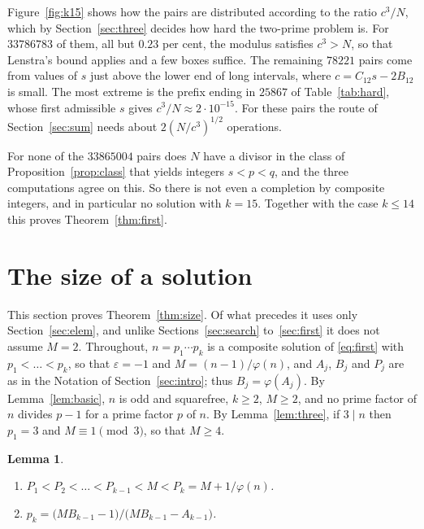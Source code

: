 \documentclass[11pt,reqno]{amsart}
\numberwithin{equation}{section}
\theoremstyle{plain}
\newtheorem{lemma}[theorem]{Lemma}
\theoremstyle{definition}
\theoremstyle{remark}
\begin{document}
Figure~\ref{fig:k15} shows how the pairs are distributed according to
the ratio $c^3/N$, which by Section~\ref{sec:three} decides how hard
the two-prime problem is. For $33786783$ of them, all but $0.23$ per
cent, the modulus satisfies $c^3>N$, so that Lenstra's bound applies
and a few boxes suffice. The remaining $78221$ pairs come from values
of $s$ just above the lower end of long intervals, where
$c=C_{12}s-2B_{12}$ is small. The most extreme is the prefix ending in
$25867$ of Table~\ref{tab:hard}, whose first admissible $s$ gives
$c^3/N\approx2\cdot10^{-15}$. For these pairs the route of
Section~\ref{sec:sum} needs about $2(N/c^3)^{1/2}$ operations.

For none of the $33865004$ pairs does $N$ have a divisor in the class of
Proposition~\ref{prop:class} that yields integers $s<p<q$, and the
three computations agree on this. So there is
not even a completion by composite integers, and in particular no
solution with $k=15$. Together with the case $k\le14$ this proves
Theorem~\ref{thm:first}.

\section{The size of a solution}\label{sec:size}

This section proves Theorem~\ref{thm:size}. Of what precedes it uses
only Section~\ref{sec:elem}, and unlike Sections~\ref{sec:search}
to~\ref{sec:first} it does not assume $M=2$. Throughout,
$n=p_1\cdots p_k$ is a composite solution of \eqref{eq:first} with
$p_1<\dots<p_k$, so that $\varepsilon=-1$ and $M=(n-1)/\varphi(n)$,
and $A_j$, $B_j$ and $P_j$ are as in the Notation of
Section~\ref{sec:intro}; thus $B_j=\varphi(A_j)$. By
Lemma~\ref{lem:basic}, $n$ is odd and squarefree, $k\ge2$, $M\ge2$,
and no prime factor of $n$ divides $p-1$ for a prime factor $p$ of
$n$. By Lemma~\ref{lem:three}, if $3\mid n$ then $p_1=3$ and
$M\equiv1\pmod3$, so that $M\ge4$.

\begin{lemma}\label{lem:sizefacts}
\begin{enumerate}[label=\textup{(\roman*)}]
\item $P_1<P_2<\dots<P_{k-1}<M<P_k=M+1/\varphi(n)$.
\item $p_k=\bigl(MB_{k-1}-1\bigr)/\bigl(MB_{k-1}-A_{k-1}\bigr)$.
\end{enumerate}
\end{lemma}
\end{document}
